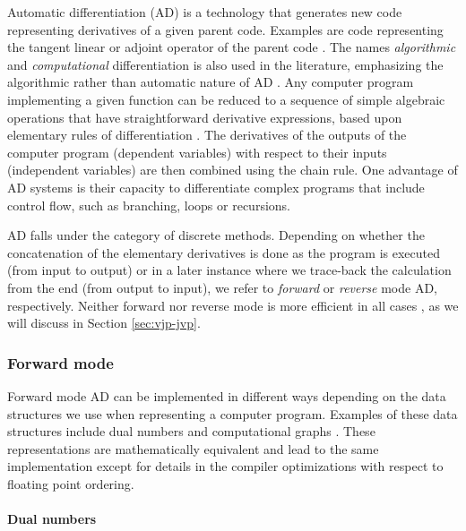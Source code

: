 Automatic differentiation (AD) is a technology that generates new code representing derivatives of a given parent code. 
Examples are code representing the tangent linear or adjoint operator of the parent code
\cite{Griewank:2008kh}. 
The names \textit{algorithmic} and \textit{computational} differentiation is also used in the literature, emphasizing the algorithmic rather than automatic nature of AD \cite{Griewank:2008kh, Naumann.2011, Margossian_2018}. 
Any computer program implementing a given function can be reduced to a sequence of simple algebraic operations that have straightforward derivative expressions, based upon elementary rules of differentiation \cite{juedes1991taxonomy}.
The derivatives of the outputs of the computer program (dependent variables) with respect to their inputs (independent variables) are then combined using the chain rule.
One advantage of AD systems is their capacity to differentiate complex programs that include control flow, such as branching, loops or recursions. 

AD falls under the category of discrete methods.
Depending on whether the concatenation of the elementary derivatives is done as the program is executed (from input to output) or in a later instance where we trace-back the calculation from the end (from output to input), we refer to \textit{forward} or \textit{reverse} mode AD, respectively.
Neither forward nor reverse mode is more efficient in all cases \cite{Griewank_1989}, as we will discuss in Section \ref{sec:vjp-jvp}.

\subsubsection{Forward mode}

Forward mode AD can be implemented in different ways depending on the data structures we use when representing a computer program. 
Examples of these data structures include dual numbers and computational graphs \cite{Baydin_Pearlmutter_Radul_Siskind_2015}. 
These representations are mathematically equivalent and lead to the same implementation except for details in the compiler optimizations with respect to floating point ordering.

\paragraph{Dual numbers}
\label{section:dual-numbers}

